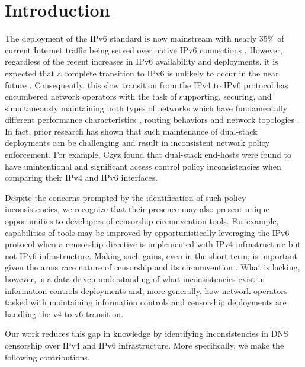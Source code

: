 \section{Introduction}\label{sec:intro}

The deployment of the IPv6 standard is now mainstream with nearly 35\% of
current Internet traffic being served over native IPv6 connections
\cite{Google-IPv6}. However, regardless of the recent increases in IPv6
availability and deployments, it is expected that a complete transition to IPv6
is unlikely to occur in the near future \cite{Prince-CF2013, Huston-APNIC2021}.
%
Consequently, this slow transition from the IPv4 to IPv6 protocol has
encumbered network operators with the task of supporting, securing, and
simultaneously maintaining both types of networks which have fundamentally
different performance characteristics \cite{Dhamdhere-IMC2012}, routing
behaviors and network topologies \cite{Czyz-SIGCOMM2014}.
%
In fact, prior research has shown that such maintenance of dual-stack
deployments can be challenging and result in inconsistent network policy
enforcement.
%
For example, Czyz \etal \cite{Czyz-NDSS2016} found that dual-stack end-hosts
were found to have unintentional and significant access control policy
inconsistencies when comparing their IPv4 and IPv6 interfaces. 

Despite the concerns prompted by the identification of such policy
inconsistencies, we recognize that their presence may also present unique
opportunities to developers of censorship circumvention tools. For example,
capabilities of tools may be improved by opportunistically leveraging the IPv6
protocol when a censorship directive is implemented with IPv4 infrastructure
but not IPv6 infrastructure.
%
Making such gains, even in the short-term, is important given the arms race
nature of censorship and its circumvention \cite{Tschantz-SP2016}.
%
What is lacking, however, is a data-driven understanding of what
inconsistencies exist in information controls deployments and, more generally,
how network operators tasked with maintaining information controls and
censorship deployments are handling the v4-to-v6 transition. 

Our work reduces this gap in knowledge by identifying inconsistencies in DNS
censorship over IPv4 and IPv6 infrastructure. More specifically, we make the
following contributions.

